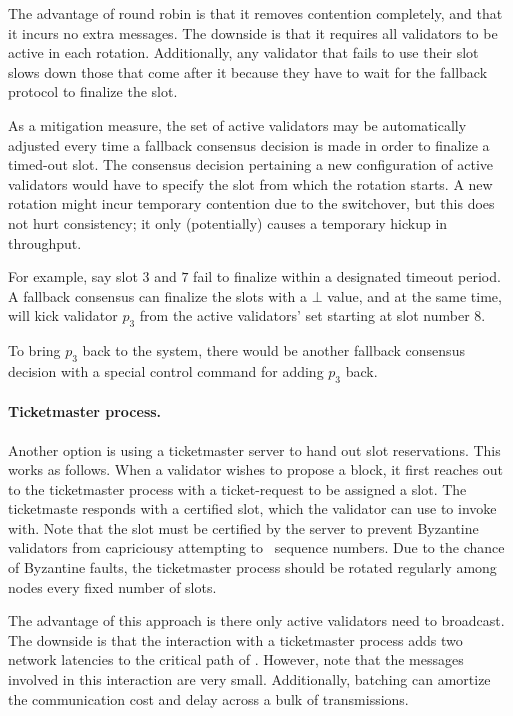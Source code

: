 The advantage of round robin is that it removes contention completely, and that it incurs no extra messages.
The downside is that it requires all validators to be active in each rotation. 
Additionally, any validator that fails to use their slot slows down 
those that come after it because they have to wait for the fallback protocol to finalize the slot.

As a mitigation measure,
the set of active validators may be automatically adjusted every time a fallback consensus decision is made in order to finalize a timed-out slot.
The consensus decision pertaining a new configuration of active validators would have to specify the slot from which the rotation starts.
A new rotation might incur temporary contention due to the switchover, but this does not hurt consistency; it only (potentially) causes a temporary hickup in throughput.

For example, say slot $3$ and $7$ fail to finalize within a designated timeout period.
A fallback consensus can finalize the slots with a $\bot$ value,
and at the same time, will kick validator $p_3$ from the active validators' set
starting at slot number $8$.

To bring $p_3$ back to the system, there would be another fallback consensus decision with a special control command for adding $p_3$ back.


\paragraph{Ticketmaster process.}
Another option is using a ticketmaster server to hand out slot reservations. This works as follows.
When a validator wishes to propose a block, it first reaches out to the ticketmaster process with a ticket-request to be assigned a slot. The ticketmaste responds with a certified slot, which the validator can use to invoke \bbcacast with.
Note that the slot must be certified by the server to prevent Byzantine validators from capriciousy attempting to \bbcacast\ sequence numbers.
Due to the chance of Byzantine faults,
the ticketmaster process should be rotated regularly among nodes every fixed number of slots.

The advantage of this approach is there only active validators need to broadcast.
The downside is that the interaction with a ticketmaster process adds two network latencies to the critical path of \primitive.
However, note that the messages involved in this interaction are very small.
Additionally, batching can amortize the communication cost and delay across a bulk of transmissions.

